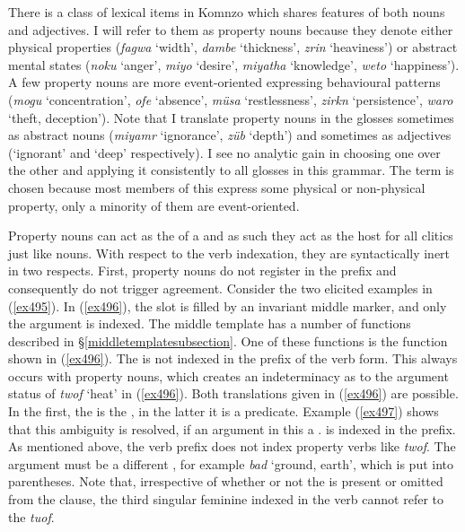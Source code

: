 There is a class of lexical items in Komnzo which shares features of both nouns and adjectives. I will refer to them as property nouns because they denote either physical properties (\emph{fagwa} `width', \emph{dambe} `thickness', \emph{zrin} `heaviness') or abstract mental states (\emph{noku} `anger', \emph{miyo} `desire', \emph{miyatha} `knowledge', \emph{weto} `happiness'). A few property nouns are more event-oriented expressing behavioural patterns (\emph{mogu} `concentration', \emph{ofe} `absence', \emph{müsa} `restlessness', \emph{zirkn} `persistence', \emph{waro} `theft, deception'). Note that I translate property nouns in the glosses sometimes as abstract nouns (\emph{miyamr} `ignorance', \emph{züb} `depth') and sometimes as adjectives (`ignorant' and `deep' respectively). I see no analytic gain in choosing one over the other and applying it consistently to all glosses in this grammar. The term  is chosen because most members of this  express some physical or non-physical property, only a minority of them are event-oriented.%

Property nouns can act as the  of a  and as such they act as the host for all  clitics just like nouns. With respect to the verb indexation, they are syntactically inert in two respects. First, property nouns do not register in the  prefix and consequently do not trigger  agreement. Consider the two elicited examples in (\ref{ex495}). In (\ref{ex496}), the  slot is filled by an invariant middle marker, and only the  argument is indexed. The middle template has a number of functions described in \S{}\ref{middletemplatesubsection}. One of these functions is the  function shown in (\ref{ex496}). The  is not indexed in the  prefix of the verb form. This always occurs with property nouns, which creates an indeterminacy as to the argument status of \emph{twof} `heat' in (\ref{ex496}). Both translations given in (\ref{ex496}) are possible. In the first, the  is the , in the latter it is a  predicate. Example (\ref{ex497}) shows that this ambiguity is resolved, if an argument \textendash{} in this  a \Tsg.\F{} \textendash{} is indexed in the prefix. As mentioned above, the verb prefix does not index property verbs like \emph{twof}. The  argument must be a different , for example \emph{bad} `ground, earth', which is put into parentheses. Note that, irrespective of whether or not the   is present or omitted from the clause, the third singular feminine indexed in the verb cannot refer to the  \emph{tuof}.

